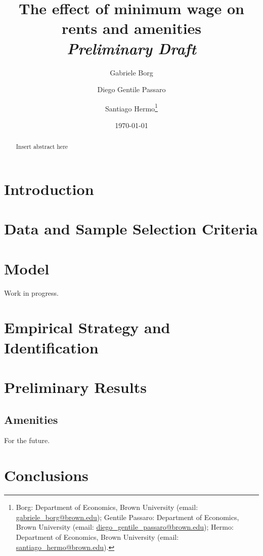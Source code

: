 \documentclass{article}
\title{The effect of minimum wage on rents and amenities \\
        \vspace{2mm} \large \textit{Preliminary Draft}}
\author{Gabriele Borg \and Diego Gentile Passaro \and Santiago Hermo\footnote{Borg: Department of Economics, Brown University (email: \url{gabriele_borg@brown.edu}); Gentile Passaro: Department of Economics, Brown University (email: \url{diego_gentile_passaro@brown.edu}); Hermo: Department of Economics, Brown University (email: \url{santiago_hermo@brown.edu}).}}
\date{\today}
\begin{document}
\maketitle

\begin{abstract}
    \noindent Insert abstract here
\end{abstract}

\vspace{5mm}

\maketitle
\onehalfspacing

\clearpage
	
\section{Introduction}\label{sec:intro}


 \section{Data and Sample Selection Criteria}\label{sec:data}


\section{Model}\label{sec:model}

Work in progress.

\section{Empirical Strategy and Identification}\label{sec:empirical_strategy}


\section{Preliminary Results}\label{sec:results}


\subsection{Amenities}

For the future. 


\section{Conclusions}
\end{document}
